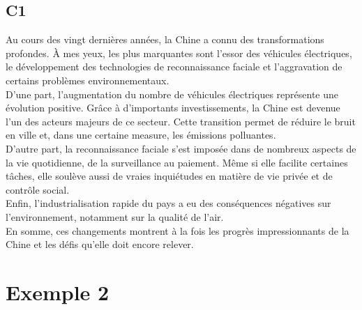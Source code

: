 \documentclass{book}
\begin{document}
        \subsection*{C1}
            Au cours des vingt dernières années, la Chine a connu des transformations profondes.
            À mes yeux, les plus marquantes sont l'essor des véhicules électriques, le développement des technologies de reconnaissance faciale
            et l'aggravation de certains problèmes environnementaux.
            \\
            D'une part, l'augmentation du nombre de véhicules électriques représente une évolution positive. 
            Grâce à d'importants investissements, la Chine est devenue l'un des acteurs majeurs de ce secteur.
            Cette transition permet de réduire le bruit en ville et, dans une certaine measure, les émissions polluantes.
            \\
            D'autre part, la reconnaissance faciale s'est imposée dans de nombreux aspects de la vie quotidienne,
            de la surveillance au paiement. Même si elle facilite certaines tâches, elle soulève aussi de vraies inquiétudes en matière
            de vie privée et de contrôle social.
            \\
            Enfin, l'industrialisation rapide du pays a eu des conséquences négatives
            sur l'environnement, notamment sur la qualité de l'air.
            \\
            En somme, ces changements montrent à la fois les progrès impressionnants de la Chine
            et les défis qu'elle doit encore relever.

    \newpage
    \section{Exemple 2}
\end{document}
